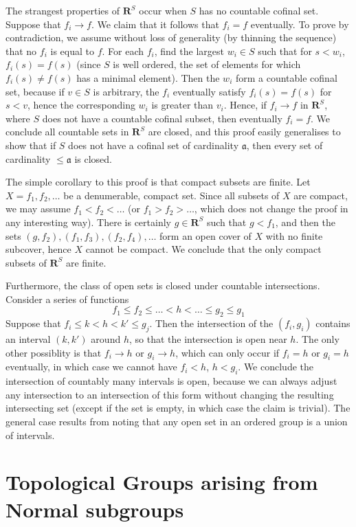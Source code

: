 The strangest properties of $\mathbf{R}^S$ occur when $S$ has no countable cofinal set. Suppose that $f_i \to f$. We claim that it follows that $f_i = f$ eventually. To prove by contradiction, we assume without loss of generality (by thinning the sequence) that no $f_i$ is equal to $f$. For each $f_i$, find the largest $w_i \in S$ such that for $s < w_i$, $f_i(s) = f(s)$ (since $S$ is well ordered, the set of elements for which $f_i(s) \neq f(s)$ has a minimal element). Then the $w_i$ form a countable cofinal set, because if $v \in S$ is arbitrary, the $f_i$ eventually satisfy $f_i(s) = f(s)$ for $s < v$, hence the corresponding $w_i$ is greater than $v_i$. Hence, if $f_i \to f$ in $\mathbf{R}^S$, where $S$ does not have a countable cofinal subset, then eventually $f_i = f$. We conclude all countable sets in $\mathbf{R}^S$ are closed, and this proof easily generalises to show that if $S$ does not have a cofinal set of cardinality $\mathfrak{a}$, then every set of cardinality $\leq \mathfrak{a}$ is closed.

The simple corollary to this proof is that compact subsets are finite. Let $X = f_1, f_2, \dots$ be a denumerable, compact set. Since all subsets of $X$ are compact, we may assume $f_1 < f_2 < \dots$ (or $f_1 > f_2 > \dots$, which does not change the proof in any interesting way). There is certainly $g \in \mathbf{R}^S$ such that $g < f_1$, and then the sets $(g,f_2), (f_1, f_3), (f_2,f_4), \dots$ form an open cover of $X$ with no finite subcover, hence $X$ cannot be compact. We conclude that the only compact subsets of $\mathbf{R}^S$ are finite.

Furthermore, the class of open sets is closed under countable intersections. Consider a series of functions
%
\[ f_1 \leq f_2 \leq \dots < h < \dots \leq g_2 \leq g_1 \]
%
Suppose that $f_i \leq k < h < k' \leq g_j$. Then the intersection of the $(f_i, g_i)$ contains an interval $(k,k')$ around $h$, so that the intersection is open near $h$. The only other possiblity is that $f_i \to h$ or $g_i \to h$, which can only occur if $f_i = h$ or $g_i = h$ eventually, in which case we cannot have $f_i < h$, $h < g_i$. We conclude the intersection of countably many intervals is open, because we can always adjust any intersection to an intersection of this form without changing the resulting intersecting set (except if the set is empty, in which case the claim is trivial). The general case results from noting that any open set in an ordered group is a union of intervals.

\section{Topological Groups arising from Normal subgroups}

